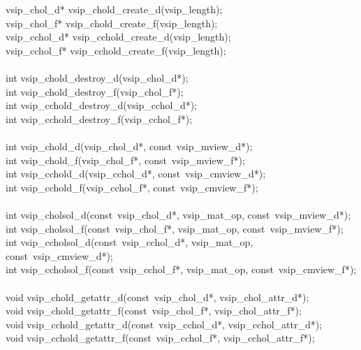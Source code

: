 \\\cvsiplh 
\begin{cfuncs}
\\ \hline
vsip\_chol\_d* vsip\_chold\_create\_d(vsip\_length);\Bs\\
vsip\_chol\_f* vsip\_chold\_create\_f(vsip\_length);\Bs\\
vsip\_cchol\_d* vsip\_cchold\_create\_d(vsip\_length);\Bs\\
vsip\_cchol\_f* vsip\_cchold\_create\_f(vsip\_length);\Bs\\
\\ \hline
int vsip\_chold\_destroy\_d(vsip\_chol\_d*);\Bs\\
int vsip\_chold\_destroy\_f(vsip\_chol\_f*);\Bs\\
int vsip\_cchold\_destroy\_d(vsip\_cchol\_d*);\Bs\\
int vsip\_cchold\_destroy\_f(vsip\_cchol\_f*);\Bs\\
\\ \hline
int vsip\_chold\_d(vsip\_chol\_d*, const~vsip\_mview\_d*);\Bs\\
int vsip\_chold\_f(vsip\_chol\_f*, const~vsip\_mview\_f*);\Bs\\
int vsip\_cchold\_d(vsip\_cchol\_d*, const~vsip\_cmview\_d*);\Bs\\
int vsip\_cchold\_f(vsip\_cchol\_f*, const~vsip\_cmview\_f*);\Bs\\
\\ \hline
int vsip\_cholsol\_d(const~vsip\_chol\_d*, vsip\_mat\_op, const~vsip\_mview\_d*);\Bs\\
int vsip\_cholsol\_f(const~vsip\_chol\_f*, vsip\_mat\_op, const~vsip\_mview\_f*);\Bs\\
int vsip\_ccholsol\_d(const~vsip\_cchol\_d*, vsip\_mat\_op, const~vsip\_cmview\_d*);\Bs\\
int vsip\_ccholsol\_f(const~vsip\_cchol\_f*, vsip\_mat\_op, const~vsip\_cmview\_f*);\Bs\\
\\ \hline
void vsip\_chold\_getattr\_d(const~vsip\_chol\_d*, vsip\_chol\_attr\_d*);\Bs\\
void vsip\_chold\_getattr\_f(const~vsip\_chol\_f*, vsip\_chol\_attr\_f*);\Bs\\
void vsip\_cchold\_getattr\_d(const~vsip\_cchol\_d*, vsip\_cchol\_attr\_d*);\Bs\\
void vsip\_cchold\_getattr\_f(const~vsip\_cchol\_f*, vsip\_cchol\_attr\_f*);\Bs\\
\hline
\end{cfuncs}

